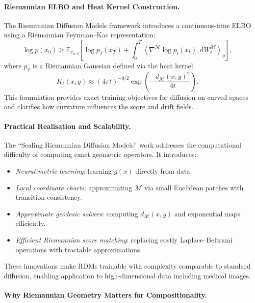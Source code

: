 \paragraph{Riemannian ELBO and Heat Kernel Construction.}

The Riemannian Diffusion Models framework introduces a continuous-time ELBO
using a Riemannian Feynman–Kac representation:
\[
\log p(x_0)
    \ge \mathbb{E}_{x_{0:T}}\!\left[
        \log p_T(x_T)
        + \int_0^T
            \left\langle
                \nabla^{\mathcal{M}} \log p_t(x_t),
                \mathrm{d}W_t^{\mathcal{M}}
            \right\rangle_g
        \right],
\]
where $p_T$ is a Riemannian Gaussian defined via the heat kernel
\[
K_t(x,y)
    \approx (4\pi t)^{-d/2}
        \exp\!\left(
            -\frac{d_{\mathcal{M}}(x,y)^2}{4t}
        \right).
\]
This formulation provides exact training objectives for diffusion on curved
spaces and clarifies how curvature influences the score and drift fields.

\paragraph{Practical Realisation and Scalability.}

The ``Scaling Riemannian Diffusion Models'' work addresses the computational
difficulty of computing exact geometric operators. It introduces:
\begin{itemize}
    \item \emph{Neural metric learning}: learning $g(x)$ directly from data.
    \item \emph{Local coordinate charts}: approximating $\mathcal{M}$ via small
          Euclidean patches with transition consistency.
    \item \emph{Approximate geodesic solvers}: computing
          $d_{\mathcal{M}}(x,y)$ and exponential maps efficiently.
    \item \emph{Efficient Riemannian score matching}: replacing costly
          Laplace–Beltrami operations with tractable approximations.
\end{itemize}
These innovations make RDMs trainable with complexity comparable to standard
diffusion, enabling application to high-dimensional data including medical
images.

\paragraph{Why Riemannian Geometry Matters for Compositionality.}

